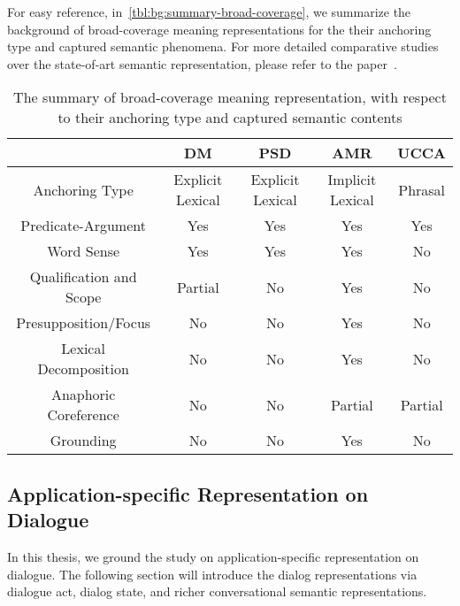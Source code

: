 For easy reference, in~\autoref{tbl:bg:summary-broad-coverage}, we summarize the background of
broad-coverage meaning representations for the their
anchoring type and captured semantic phenomena. For more detailed
comparative studies over the state-of-art semantic representation,
please refer to the paper~\cite{abend2017state}.

\begin{table}[ht]
  \begin{center}
\setlength{\tabcolsep}{4pt}
{\small
\begin{tabular}{c|cccc}
  \toprule
  \hline
  & {\bf DM}               & {\bf PSD}              & {\bf AMR}              & {\bf UCCA}    \\ \hline
  Anchoring Type          & Explicit Lexical & Explicit Lexical & Implicit Lexical & Phrasal \\ \hline
  Predicate-Argument      & Yes              & Yes              & Yes              & Yes     \\
  Word Sense              & Yes              & Yes              & Yes              & No      \\
  Qualification and Scope & Partial          & No               & Yes              & No      \\
  Presupposition/Focus    & No               & No               & Yes              & No      \\
  Lexical Decomposition   & No               & No               & Yes              & No      \\
  Anaphoric Coreference   & No               & No               & Partial          & Partial \\
  Grounding               & No               & No               & Yes              & No \\ \hline
  \bottomrule

\end{tabular}}
\end{center}
\caption{The summary of broad-coverage meaning representation, with respect to their anchoring type and captured semantic contents}
\label{tbl:bg:summary-broad-coverage}
\end{table}


\subsection{Application-specific Representation on Dialogue}
\label{ssec:bg:dialogue-mr}

In this thesis, we ground the study on application-specific
representation on dialogue. The following section will introduce the
dialog representations via dialogue act, dialog state, and richer
conversational semantic representations.

